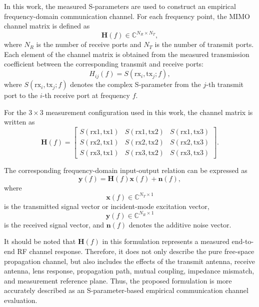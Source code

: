\documentclass[10pt]{article}
\begin{document}
In this work, the measured S-parameters are used to construct an empirical frequency-domain communication channel. 
For each frequency point, the MIMO channel matrix is defined as
\begin{equation}
    \mathbf{H}(f) \in \mathbb{C}^{N_R \times N_T},
\end{equation}
where \(N_R\) is the number of receive ports and \(N_T\) is the number of transmit ports. 
Each element of the channel matrix is obtained from the measured transmission coefficient between the corresponding transmit and receive ports:
\begin{equation}
    H_{ij}(f) = S(\mathrm{rx}_i,\mathrm{tx}_j;f),
\end{equation}
where \(S(\mathrm{rx}_i,\mathrm{tx}_j;f)\) denotes the complex S-parameter from the \(j\)-th transmit port to the \(i\)-th receive port at frequency \(f\).

For the \(3 \times 3\) measurement configuration used in this work, the channel matrix is written as
\begin{equation}
\mathbf{H}(f)
=
\begin{bmatrix}
S(\mathrm{rx1},\mathrm{tx1}) & S(\mathrm{rx1},\mathrm{tx2}) & S(\mathrm{rx1},\mathrm{tx3}) \\
S(\mathrm{rx2},\mathrm{tx1}) & S(\mathrm{rx2},\mathrm{tx2}) & S(\mathrm{rx2},\mathrm{tx3}) \\
S(\mathrm{rx3},\mathrm{tx1}) & S(\mathrm{rx3},\mathrm{tx2}) & S(\mathrm{rx3},\mathrm{tx3})
\end{bmatrix}.
\end{equation}

The corresponding frequency-domain input-output relation can be expressed as
\begin{equation}
    \mathbf{y}(f) = \mathbf{H}(f)\mathbf{x}(f) + \mathbf{n}(f),
\end{equation}
where
\begin{equation}
    \mathbf{x}(f) \in \mathbb{C}^{N_T \times 1}
\end{equation}
is the transmitted signal vector or incident-mode excitation vector,
\begin{equation}
    \mathbf{y}(f) \in \mathbb{C}^{N_R \times 1}
\end{equation}
is the received signal vector, and \(\mathbf{n}(f)\) denotes the additive noise vector.

It should be noted that \(\mathbf{H}(f)\) in this formulation represents a measured end-to-end RF channel response. 
Therefore, it does not only describe the pure free-space propagation channel, but also includes the effects of the transmit antenna, receive antenna, lens response, propagation path, mutual coupling, impedance mismatch, and measurement reference plane. 
Thus, the proposed formulation is more accurately described as an S-parameter-based empirical communication channel evaluation.
\end{document}
